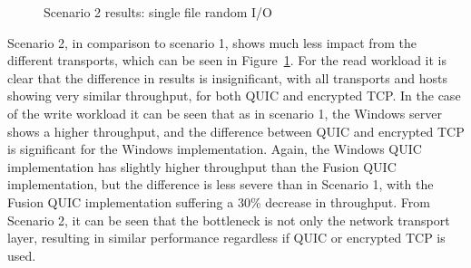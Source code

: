 \documentclass[english, 12pt, a4paper, elec, utf8, a-2b, online]{aaltothesis}
\begin{document}
\begin{figure}[h]
\centering
{}

\caption{Scenario 2 results: single file random I/O}
\label{fig:scenario_2}
\end{figure}

Scenario 2, in comparison to scenario 1, shows much less impact from the different
transports, which can be seen in Figure~\ref{fig:scenario_2}. For the read workload it is
clear that the difference in results is insignificant, with all transports and hosts
showing very similar throughput, for both QUIC and encrypted TCP. In the case of the write workload it can be seen
that as in scenario 1, the Windows server shows a higher throughput, and the difference
between QUIC and encrypted TCP is significant for the Windows implementation. Again, the
Windows QUIC implementation has slightly higher throughput than the Fusion QUIC implementation,
but the difference is less severe than in Scenario 1, with the Fusion QUIC implementation
suffering a 30\% decrease in throughput. From Scenario 2, it can be seen that the bottleneck is
not only the network transport layer, resulting in similar performance regardless
if QUIC or encrypted TCP is used.
\end{document}
